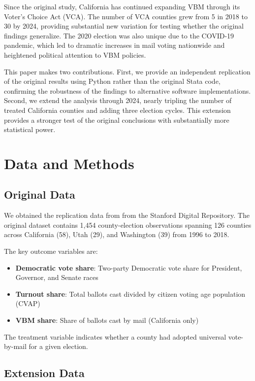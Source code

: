 \documentclass[12pt]{article}
\begin{document}
Since the original study, California has continued expanding VBM through its Voter's Choice Act (VCA). The number of VCA counties grew from 5 in 2018 to 30 by 2024, providing substantial new variation for testing whether the original findings generalize. The 2020 election was also unique due to the COVID-19 pandemic, which led to dramatic increases in mail voting nationwide and heightened political attention to VBM policies.

This paper makes two contributions. First, we provide an independent replication of the original results using Python rather than the original Stata code, confirming the robustness of the findings to alternative software implementations. Second, we extend the analysis through 2024, nearly tripling the number of treated California counties and adding three election cycles. This extension provides a stronger test of the original conclusions with substantially more statistical power.

\section{Data and Methods}

\subsection{Original Data}

We obtained the replication data from \citet{thompson2020universal} from the Stanford Digital Repository. The original dataset contains 1,454 county-election observations spanning 126 counties across California (58), Utah (29), and Washington (39) from 1996 to 2018.

The key outcome variables are:
\begin{itemize}
    \item \textbf{Democratic vote share}: Two-party Democratic vote share for President, Governor, and Senate races
    \item \textbf{Turnout share}: Total ballots cast divided by citizen voting age population (CVAP)
    \item \textbf{VBM share}: Share of ballots cast by mail (California only)
\end{itemize}

The treatment variable indicates whether a county had adopted universal vote-by-mail for a given election.

\subsection{Extension Data}
\end{document}
